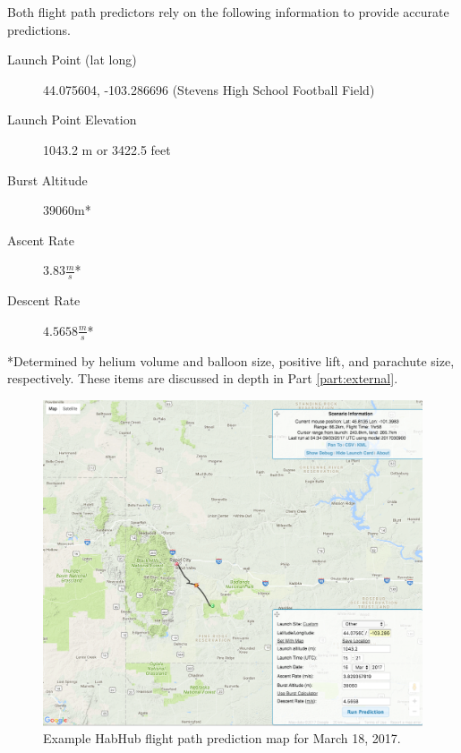 \documentclass[english]{report}
\begin{document}

Both flight path predictors rely on the following information to provide accurate predictions.

\begin{description}
\item [Launch Point (lat long)] 44.075604, -103.286696 (Stevens High School Football Field)
\item [Launch Point Elevation] 1043.2 m or 3422.5 feet
\item [Burst Altitude] 39060m*
\item [Ascent Rate] $3.83 \si{\frac{m}{s}}$*
\item [Descent Rate] $4.5658\si{\frac{m}{s}}$*
\end{description}
*Determined by helium volume and balloon size, positive lift, and parachute size, respectively.  These items are discussed in depth in Part \ref{part:external}.

\begin{figure}[H]
\begin{centering}
\includegraphics[scale=0.4]{./images/habhub}
\par\end{centering}
\label{fig:hahub}
\caption{Example HabHub flight path prediction map for March 18, 2017.}
\end{figure}
\end{document}
